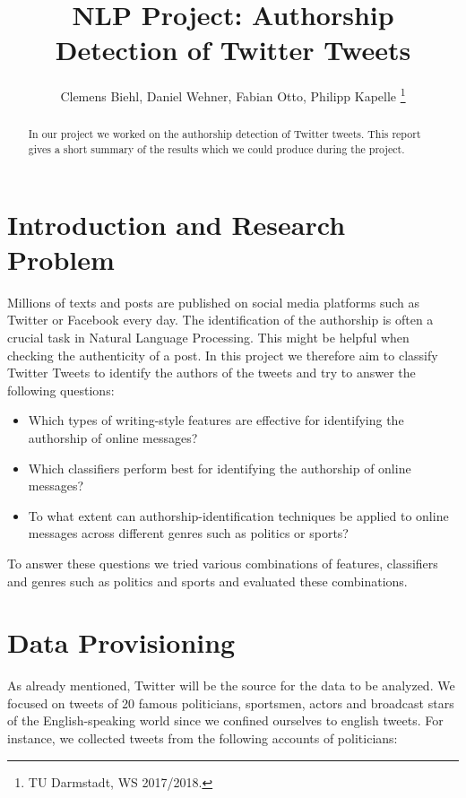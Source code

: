 \documentclass[journal, a4paper, 12pt]{IEEEtran}
\begin{document}
\title{NLP Project: Authorship Detection of Twitter Tweets}
\author{Clemens Biehl, Daniel Wehner, Fabian Otto, Philipp Kapelle
\thanks{TU Darmstadt, WS 2017/2018.}}
\maketitle

\begin{abstract}
In our project we worked on the authorship detection of Twitter tweets. This report gives a short summary of the results which we could produce during the project.
\end{abstract}
	
\section{Introduction and Research Problem}
Millions of texts and posts are published on social media platforms such as Twitter or Facebook every day. The identification of the authorship is often a crucial task in Natural Language Processing. This might be helpful when checking the authenticity of a post. In this project we therefore aim to classify Twitter Tweets to identify the authors of the tweets and try to answer the following questions:
\vspace{-2mm}
\begin{itemize}
\item Which types of writing-style features are effective for identifying the authorship of online messages?
\item Which classifiers perform best for identifying the authorship of online messages?
\item To what extent can authorship-identification techniques be applied to online messages across different genres such as politics or sports?
\end{itemize}
\vspace{-2mm}
To answer these questions we tried various combinations of features, classifiers and genres such as politics and sports and evaluated these combinations.

\section{Data Provisioning}
\label{sec:provisioning}
\vspace{-2mm}
As already mentioned, Twitter will be the source for the data to be analyzed. We focused on tweets of 20 famous politicians, sportsmen, actors and broadcast stars of the English-speaking world since we confined ourselves to english tweets. For instance, we collected tweets from the following accounts of politicians:
\end{document}
